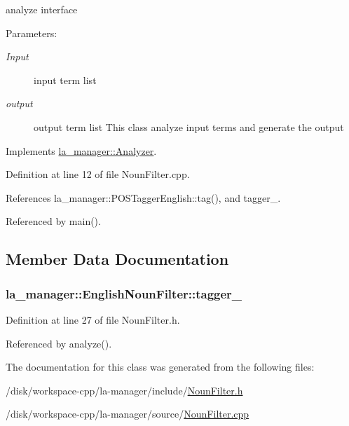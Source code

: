 analyze interface 

\begin{Desc}
\item[Parameters:]
\begin{description}
\item[{\em Input}]input term list \item[{\em output}]output term list This class analyze input terms and generate the output \end{description}
\end{Desc}


Implements \hyperlink{classla__manager_1_1Analyzer_a096ba4b2faeaa0f3938d7b826ab1c78}{la\_\-manager::Analyzer}.

Definition at line 12 of file NounFilter.cpp.

References la\_\-manager::POSTaggerEnglish::tag(), and tagger\_\-.

Referenced by main().

\subsection{Member Data Documentation}
\hypertarget{classla__manager_1_1EnglishNounFilter_d612ad131bb8a08e35fc92ff0c01930b}{
\subsubsection[{tagger\_\-}]{ {\bf la\_\-manager::EnglishNounFilter::tagger\_\-}}}
\label{classla__manager_1_1EnglishNounFilter_d612ad131bb8a08e35fc92ff0c01930b}




Definition at line 27 of file NounFilter.h.

Referenced by analyze().

The documentation for this class was generated from the following files:\begin{CompactItemize}
\item 
/disk/workspace-cpp/la-manager/include/\hyperlink{NounFilter_8h}{NounFilter.h}\item 
/disk/workspace-cpp/la-manager/source/\hyperlink{NounFilter_8cpp}{NounFilter.cpp}\end{CompactItemize}
